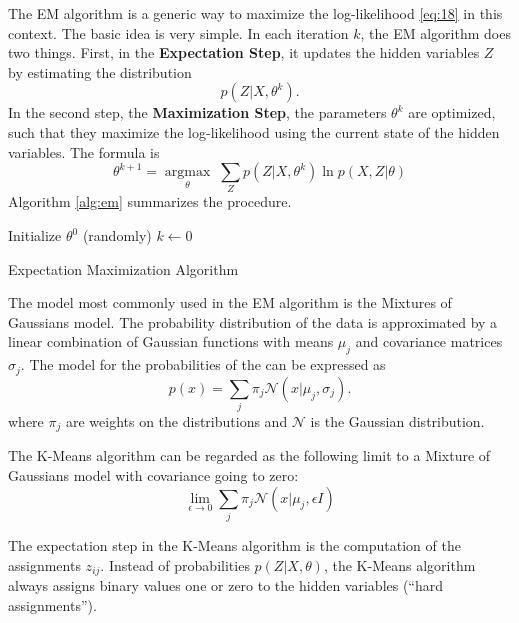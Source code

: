 The EM algorithm is a generic way to maximize the log-likelihood \eqref{eq:18} in this context.
The basic idea is very simple.
In each iteration $k$, the EM algorithm does two things.
First, in the \textbf{Expectation Step}, it updates the hidden variables $Z$ by estimating the distribution
\begin{equation}
  \label{eq:20}
  p(Z|X,\theta^k).
\end{equation}
In the second step, the \textbf{Maximization Step}, the parameters $\theta^k$ are optimized, such that they maximize the log-likelihood using the current state of the hidden variables. The formula is
\begin{equation}
  \label{eq:21}
  \theta^{k+1} = \underset{\theta}{\operatorname{argmax}}\; \sum_Zp(Z|X,\theta^k)\ln p(X,Z|\theta)
\end{equation}
Algorithm \ref{alg:em} summarizes the procedure.
\begin{algorithm}
  Initialize $\theta^0$ (randomly)\;
  $k\leftarrow 0$\;
  \caption{Expectation Maximization Algorithm}
  \label{alg:em}
\end{algorithm}

The model most commonly used in the EM algorithm is the Mixtures of Gaussians model.
The probability distribution of the data is approximated by a linear combination of Gaussian functions with means $\mu_j$ and covariance matrices $\sigma_j$.
The model for the probabilities of the can be expressed as
\begin{equation}
  \label{eq:22}
  p(x) = \sum_{j}\pi_j\mathcal{N}(x|\mu_j,\sigma_j). 
\end{equation}
where $\pi_j$ are weights on the distributions and $\mathcal{N}$ is the Gaussian distribution.


The K-Means algorithm can be regarded as the following limit to a Mixture of Gaussians model with covariance going to zero:
\begin{equation}
  \label{eq:23}
  \lim\limits_{\epsilon\rightarrow 0}\sum_j\pi_j\mathcal{N}(x| \mu_j,\epsilon I)
\end{equation}

The expectation step in the K-Means algorithm is the computation of the assignments $z_{ij}$. Instead of probabilities $p(Z|X,\theta)$, the K-Means algorithm always assigns binary values one or zero to the hidden variables (``hard assignments'').


